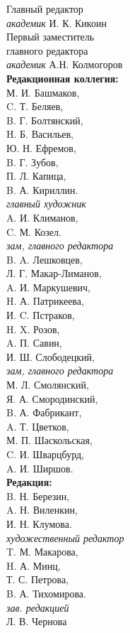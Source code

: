 \begin{wrapfigure}{l}{0.32\textwidth}
\begin{spacing}{0.9}
\noindent Главный редактор\\
\textit{академик} И. К. Кикоин\\
Первый заместитель\\
главного редактора\\
\textit{академик} А.Н. Колмогоров\\
\newline
\textbf{Редакционная коллегия:}\\
М. И. Башмаков,\\
C. Т. Беляев,\\
B. Г. Болтянский,\\
H. Б. Васильев,\\
Ю. Н. Ефремов,\\
B. Г. Зубов,\\
П. Л. Капица,\\
B. А. Кириллин.\\
\textit{главный художник}\\
A. И. Климанов,\\
C. М. Козел.\\
\textit{зам, главного редактора}\\
B. A. Лешковцев,\\
Л. Г. Макар-Лиманов,\\
A. И. Маркушевич,\\
H. А. Патрикеева,\\
И. C. Пстраков,\\
H. X. Розов,\\
A. П. Савин,\\
И. Ш. Слободецкий,\\
\textit{зам, главного редактора}\\
М. Л. Смолянский,\\
Я. А. Смородинский,\\
B. А. Фабрикант,\\
A. Т. Цветков,\\
М. П. Шаскольская,\\
C. И. Шварцбурд,\\
A. И. Ширшов.\\
\newline
\textbf{Редакция:}\\
B. Н. Березин,\\
A. Н. Виленкин,\\
И. Н. Клумова.\\
\textit{художественный редактор}\\
T. М. Макарова,\\
H. А. Минц,\\
Т. С. Петрова,\\
B. А. Тихомирова.\\
\textit{зав. редакцией}\\
Л. В. Чернова\\
\end{spacing}
\end{wrapfigure}

